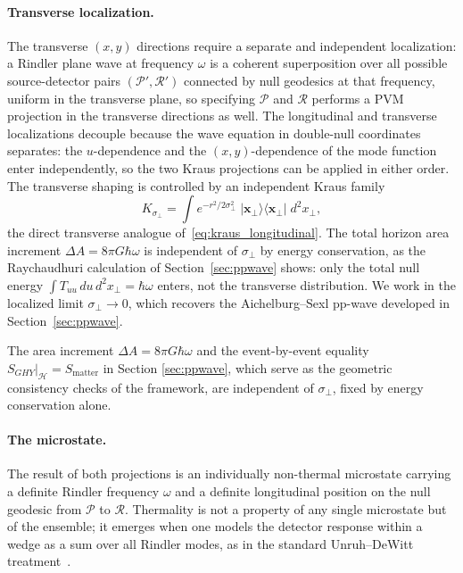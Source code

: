 \documentclass[12pt,a4paper]{article}
\begin{document}
\paragraph{Transverse localization.}
The transverse $(x,y)$ directions require a separate 
and independent localization: a Rindler plane wave at 
frequency $\omega$ is a coherent superposition over all 
possible source-detector pairs $(\mathcal{P}', \mathcal{R}')$ 
connected by null geodesics at that frequency, uniform 
in the transverse plane, so specifying $\mathcal{P}$ and 
$\mathcal{R}$ performs a PVM projection in the transverse 
directions as well.
The longitudinal and transverse localizations decouple 
because the wave equation in double-null coordinates 
separates: the $u$-dependence and the $(x,y)$-dependence 
of the mode function enter independently, so the two 
Kraus projections can be applied in either order.
The transverse shaping is controlled by an 
independent Kraus family
\begin{equation}
  K_{\sigma_\perp} = \int e^{-r^2/2\sigma_\perp^2}\;
  |\mathbf{x}_\perp\rangle\langle \mathbf{x}_\perp|\; 
  d^2x_\perp,
\label{eq:kraus}
\end{equation}
the direct transverse analogue 
of~\eqref{eq:kraus_longitudinal}. The total horizon area 
increment $\Delta A = 8\pi G\hbar\omega$ is independent 
of $\sigma_\perp$ by energy conservation, as the 
Raychaudhuri calculation of Section~\ref{sec:ppwave} 
shows: only the total null energy 
$\int T_{uu}\,du\,d^2x_\perp = \hbar\omega$ enters, not 
the transverse distribution. We work in the localized 
limit $\sigma_\perp \to 0$, which recovers the 
Aichelburg--Sexl pp-wave developed in 
Section~\ref{sec:ppwave}. 

The area increment $\Delta A = 8\pi G\hbar\omega$ and the event-by-event equality 
$S_{GHY}|_{\mathcal{H}} = S_{\mathrm{matter}}$
in Section \ref{sec:ppwave},
which serve as the geometric consistency checks of 
the framework, are independent of $\sigma_\perp$, 
fixed by energy conservation alone.

\paragraph{The microstate.}
The result of both projections is an individually 
non-thermal microstate carrying a definite Rindler 
frequency $\omega$ and a definite longitudinal 
position on the null geodesic from $\mathcal{P}$ 
to $\mathcal{R}$. Thermality is not a property of 
any single microstate but of the ensemble; it 
emerges when one models the detector response 
within a wedge as a sum over all Rindler modes, 
as in the standard Unruh--DeWitt 
treatment~\cite{unruh1976notes,einstein1979general}.
\end{document}
